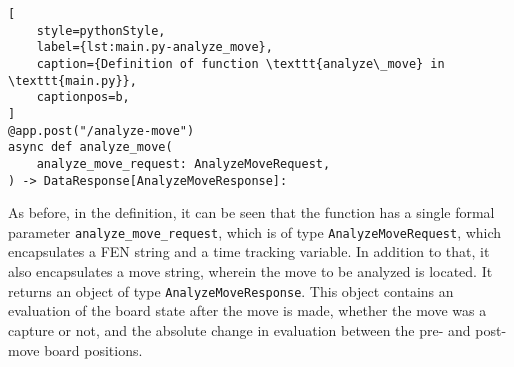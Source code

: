 \begin{lstlisting}[
    style=pythonStyle,
    label={lst:main.py-analyze_move},
    caption={Definition of function \texttt{analyze\_move} in \texttt{main.py}},
    captionpos=b,
]
@app.post("/analyze-move")
async def analyze_move(
    analyze_move_request: AnalyzeMoveRequest,
) -> DataResponse[AnalyzeMoveResponse]:
\end{lstlisting}

As before, in the definition, it can be seen that the function has a single formal parameter
\texttt{analyze\_move\_request}, which is of type \texttt{AnalyzeMoveRequest}, which encapsulates a FEN string and a
time tracking variable.
In addition to that, it also encapsulates a move string, wherein the move to be analyzed is located.
It returns an object of type \texttt{AnalyzeMoveResponse}.
This object contains an evaluation of the board state after the move is made, whether the move was a capture or not,
and the absolute change in evaluation between the pre- and post-move board positions.

